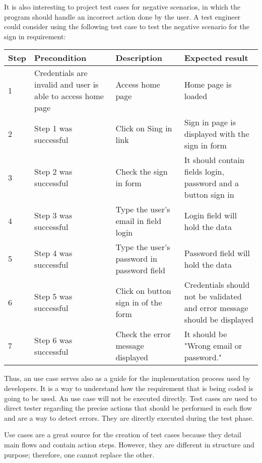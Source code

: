 It is also interesting to project test cases for negative scenarios, in which the program should handle an incorrect action done by the user. A test engineer could consider using the following test case to test the negative scenario for the sign in requirement:

\begin{center}
\begin{tabular}{| l | p{3cm} | p{5cm} | p{5cm} |}
\hline

Step & Precondition & Description & Expected result \\ \hline

1 & Credentials are invalid and user is able to access home page & Access home page & Home page is loaded\\ \hline

2 & Step 1 was successful & Click on Sing in link & Sign in page is displayed with the sign in form \\ \hline

3 & Step 2 was successful & Check the sign in form & It should contain fields login, password and a button sign in \\ \hline

4 & Step 3 was successful & Type the user's email in field login & Login field will hold the data\\ \hline

5 & Step 4 was successful & Type the user's password in password field & Password field will hold the data \\ \hline

6 & Step 5 was successful & Click on button sign in of the form & Credentials should not be validated and error message should be displayed \\ \hline

7 & Step 6 was successful & Check the error message displayed & It should be "Wrong email or password."\\

\hline
\end{tabular}

\end{center}







Thus, an use case serves also as a guide for the implementation process used by developers. It is a way to understand how the requirement that is being coded is going to be used. An use case will not be executed directly. Test cases are used to direct tester regarding the precise actions that should be performed in each flow and are a way to detect errors. They are directly executed during the test phase.

Use cases are a great source for the creation of test cases because they detail main flows and contain action steps. However, they are different in structure and purpose; therefore, one cannot replace the other.

